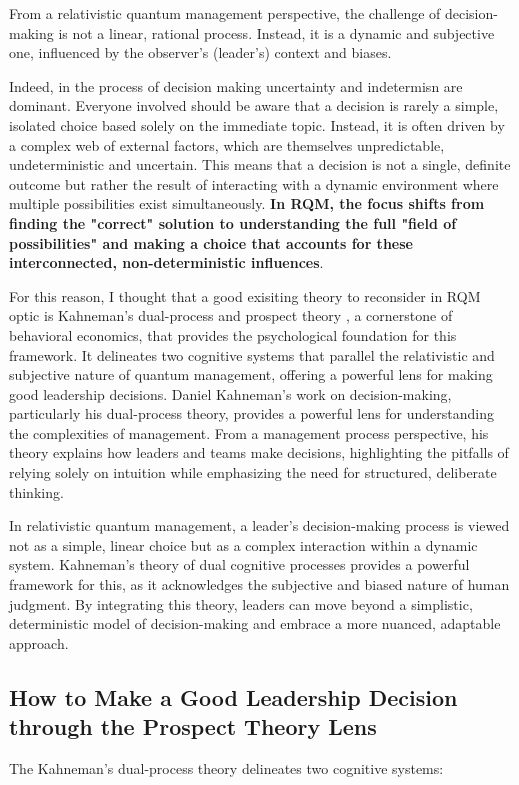 \documentclass{article}
\begin{document}
From a relativistic quantum management perspective, the challenge of decision-making is not a linear, rational process. Instead, it is a dynamic and subjective one, influenced by the observer's (leader's) context and biases. 

Indeed, in the process of decision making uncertainty and indetermisn are dominant. Everyone involved should be aware that a decision is rarely a simple, isolated choice based solely on the immediate topic. Instead, it is often driven by a complex web of external factors, which are themselves unpredictable, undeterministic and uncertain. This means that a decision is not a single, definite outcome but rather the result of interacting with a dynamic environment where multiple possibilities exist simultaneously. \textbf{In RQM, the focus shifts from finding the "correct" solution to understanding the full "field of possibilities" and making a choice that accounts for these interconnected, non-deterministic influences}.

For this reason, I thought that a good exisiting theory to reconsider in RQM optic is Kahneman's dual-process and prospect theory \cite{kahneman2011thinking}, a cornerstone of behavioral economics, that provides the psychological foundation for this framework. It delineates two cognitive systems that parallel the relativistic and subjective nature of quantum management, offering a powerful lens for making good leadership decisions.
Daniel Kahneman's work on decision-making, particularly his dual-process theory, provides a powerful lens for understanding the complexities of management. From a management process perspective, his theory explains how leaders and teams make decisions, highlighting the pitfalls of relying solely on intuition while emphasizing the need for structured, deliberate thinking.

In relativistic quantum management, a leader's decision-making process is viewed not as a simple, linear choice but as a complex interaction within a dynamic system. Kahneman's theory of dual cognitive processes provides a powerful framework for this, as it acknowledges the subjective and biased nature of human judgment. By integrating this theory, leaders can move beyond a simplistic, deterministic model of decision-making and embrace a more nuanced, adaptable approach.
\newpage
\subsection{How to Make a Good Leadership Decision through the Prospect Theory Lens}
\label{dual}
The Kahneman's dual-process theory \cite{kahneman2011thinking} delineates two cognitive systems:
\end{document}
